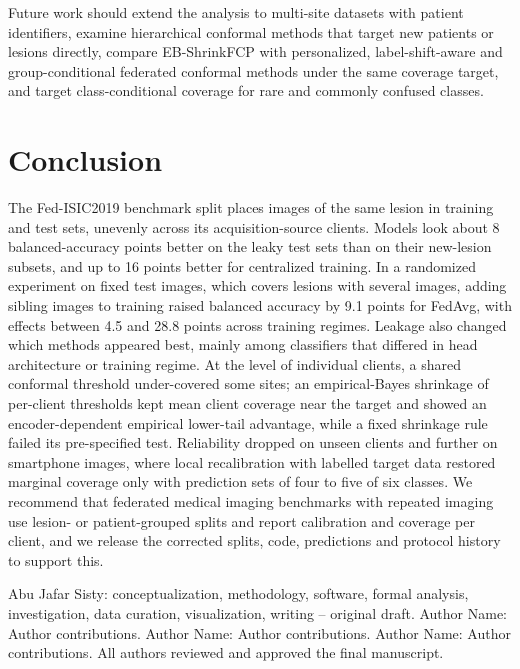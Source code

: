 \documentclass[VANCOUVER,Times1COL]{WileyNJDv5}
\begin{document}
Future work should extend the analysis to multi-site datasets with patient identifiers, examine
hierarchical conformal methods that target new patients or lesions directly, compare EB-ShrinkFCP with
personalized, label-shift-aware and group-conditional federated conformal methods
\cite{min2025pfcp,plassier2023labelshift,wen2026gcfcp} under the same coverage target, and target
class-conditional coverage for rare and commonly confused classes.

\section{Conclusion}
\label{sec:conclusion}

The Fed-ISIC2019 benchmark split places images of the same lesion in training and test sets, unevenly
across its acquisition-source clients. Models look about 8 balanced-accuracy points better on the leaky
test sets than on their new-lesion subsets, and up to 16 points better for centralized training.
In a randomized experiment on fixed test images, which covers lesions with several images, adding sibling
images to training raised balanced accuracy by 9.1 points for FedAvg, with effects between 4.5 and 28.8
points across training regimes. Leakage also changed which methods appeared best, mainly among classifiers
that differed in head architecture or training regime. At the level of individual clients, a shared conformal threshold under-covered some
sites; an empirical-Bayes shrinkage of per-client thresholds kept mean client coverage near the target and
showed an encoder-dependent empirical lower-tail advantage, while a fixed shrinkage rule failed its pre-specified test. Reliability dropped on unseen clients and further on smartphone images, where local recalibration with labelled target data restored marginal coverage only with prediction sets of four to five of six classes. We recommend that federated medical
imaging benchmarks with repeated imaging use lesion- or patient-grouped splits and report calibration and
coverage per client, and we release the corrected splits, code, predictions and protocol history to
support this.

Abu Jafar Sisty: conceptualization, methodology, software, formal analysis, investigation, data
curation, visualization, writing -- original draft. Author Name: Author contributions. Author Name:
Author contributions. Author Name: Author contributions. All authors reviewed and approved the final
manuscript. %
\end{document}
